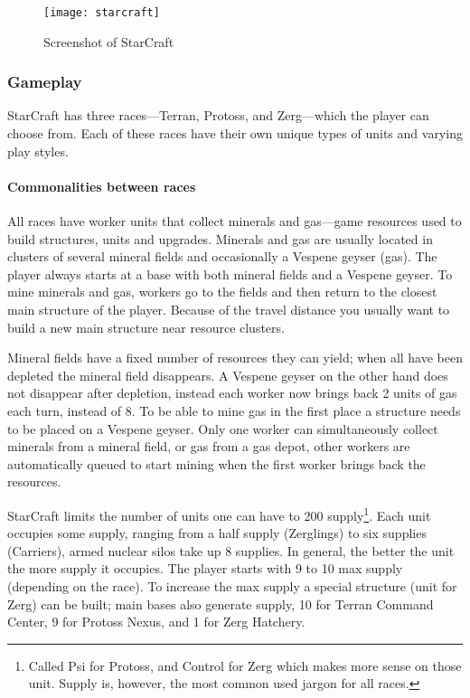 \begin{figure}[htb]
\centering
\texttt{[image: starcraft]}
\caption{Screenshot of StarCraft}
\label{fig:starcraft}
\end{figure}

\subsubsection{Gameplay} StarCraft has three races—Terran, Protoss, and Zerg—which the player can
choose from. Each of these races have their own unique types of units and varying play styles.

\paragraph{Commonalities between races} All races have worker units that collect minerals and
gas—game resources used to build structures, units and upgrades. Minerals and gas are usually
located in clusters of several mineral fields and occasionally a Vespene geyser (gas). The player
always starts at a base with both mineral fields and a Vespene geyser. To mine minerals and gas,
workers go to the fields and then return to the closest main structure of the player. Because of the
travel distance you usually want to build a new main structure near resource clusters.

Mineral fields have a fixed number of resources they can yield; when all have been depleted the
mineral field disappears. A Vespene geyser on the other hand does not disappear after depletion,
instead each worker now brings back 2 units of gas each turn, instead of 8. To be able to mine gas
in the first place a structure needs to be placed on a Vespene geyser. Only one worker can
simultaneously collect minerals from a mineral field, or gas from a gas depot, other workers are
automatically queued to start mining when the first worker brings back the resources.

\label{sec:starcraft_supply} StarCraft limits the number of units one can have to 200
supply\footnote{Called Psi for Protoss, and Control for Zerg which makes more sense on those unit.
Supply is, however, the most common used jargon for all races.}. Each unit occupies some supply,
ranging from a half supply (Zerglings) to six supplies (Carriers), armed nuclear silos take up 8
supplies. In general, the better the unit the more supply it occupies. The player starts with 9 to
10 max supply (depending on the race). To increase the max supply a special structure (unit for
Zerg) can be built; main bases also generate supply, 10 for Terran Command Center, 9 for Protoss
Nexus, and 1 for Zerg Hatchery.

